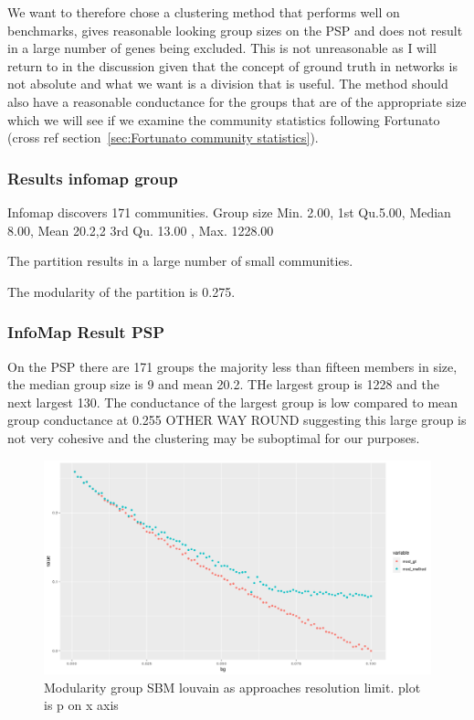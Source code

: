  




We want to therefore chose a clustering method that performs well on benchmarks, gives reasonable looking group sizes on the PSP and does not result in a large number of genes being excluded. This is not unreasonable as I will return to in the discussion given that the concept of ground truth in networks is not absolute and what we want is a division that is useful. The method should also have a reasonable conductance for the groups that are of the appropriate size which we will see if we examine the community statistics following Fortunato (cross ref section~\ref{sec:Fortunato community statistics}). 


\subsubsection{Results infomap group}
\label{sec:infomap_results}

Infomap discovers 171 communities. Group size  Min. 2.00, 1st  Qu.5.00,   Median 8.00,     Mean 20.2,2 3rd Qu. 13.00 ,  Max. 1228.00

The partition results in a large number of small communities. 

The modularity of the partition is 0.275.
\subsubsection{ InfoMap Result PSP}
On the PSP there are 171 groups the majority less than fifteen members in size, the median group size is 9 and mean 20.2. THe largest group is 1228 and the next largest 130. The conductance of the largest group is low compared to mean group conductance at 0.255 OTHER WAY ROUND  suggesting this large group is not very cohesive and the clustering may be suboptimal for our purposes. 




\begin{figure}
    \centering
    \includegraphics[width=\textwidth]{images/Rplot_rough_modularity_lou_ground_truth.png}
    \caption{Modularity group SBM louvain as approaches resolution limit. plot is p on x axis}
    \label{fig:my_rough_louvain modularity}
\end{figure}

